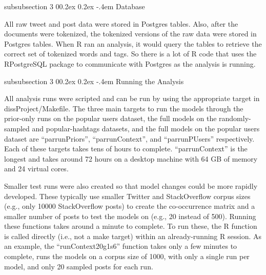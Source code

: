 \documentclass[man,floatsintext,donotrepeattitle]{apa6}
\makeatletter
\renewcommand{\subsubsection}{%
  \@startsection
  {subsubsection}%
  {3}%
  {\parindent}%
  {0\baselineskip \@plus 0.2ex \@minus 0.2ex}%
  {-.4em}%
  {\normalfont\normalsize\bfseries\addperi}}
\makeatother
\begin{document}
\subsubsection{Database}

All raw tweet and post data were stored in Postgres tables.
Also, after the documents were tokenized, the tokenized versions of the raw data were stored in Postgres tables.
When R ran an analysis, it would query the tables to retrieve the correct set of tokenized words and tags.
So there is a lot of R code that uses the RPostgreSQL package to communicate with Postgres as the analysis is running.

\subsubsection{Running the Analysis}

All analysis runs were scripted and can be run by using the appropriate target in dissProject/Makefile.
The three main targets to run the models through the prior-only runs on the popular users dataset,
the full models on the randomly-sampled and popular-hashtags datasets,
and the full models on the popular users dataset are ``parrunPriors'', ``parrunContext'', and ``parrunPUsers'' respectively.
Each of these targets takes tens of hours to complete.
``parrunContext'' is the longest and takes around 72 hours on a desktop machine with 64 GB of memory and 24 virtual cores.

Smaller test runs were also created so that model changes could be more rapidly developed.
These typically use smaller Twitter and StackOverflow corpus sizes (e.g., only \num{10000} StackOverflow posts) to create the co-occurrence matrix
and a smaller number of posts to test the models on (e.g., 20 instead of 500).
Running these functions takes around a minute to complete.
To run these, the R function is called directly (i.e., not a make target) within an already-running R session.
As an example, the ``runContext20g1s6'' function takes only a few minutes to complete, runs the models on a corpus size of \num{1000}, with only a single run per model, and only 20 sampled posts for each run.
\end{document}
